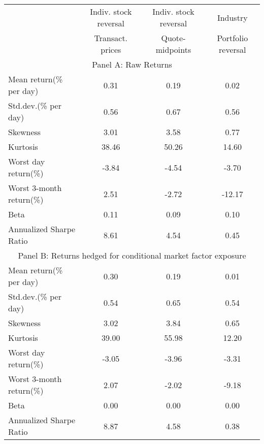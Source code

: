 \begin{tabular}{lccc}
\toprule
& Indiv. stock reversal & Indiv. stock reversal & Industry \\
& Transact. prices & Quote-midpoints & Portfolio reversal \\
\midrule
\multicolumn{4}{c}{Panel A: Raw Returns} \\
\midrule
Mean return(\% per day) & 0.31 & 0.19 & 0.02 \\
Std.dev.(\% per day) & 0.56 & 0.67 & 0.56 \\
Skewness & 3.01 & 3.58 & 0.77 \\
Kurtosis & 38.46 & 50.26 & 14.60 \\
Worst day return(\%) & -3.84 & -4.54 & -3.70 \\
Worst 3-month return(\%) & 2.51 & -2.72 & -12.17 \\
Beta & 0.11 & 0.09 & 0.10 \\
Annualized Sharpe Ratio & 8.61 & 4.54 & 0.45 \\
\midrule
\multicolumn{4}{c}{Panel B: Returns hedged for conditional market factor exposure} \\
\midrule
Mean return(\% per day) & 0.30 & 0.19 & 0.01 \\
Std.dev.(\% per day) & 0.54 & 0.65 & 0.54 \\
Skewness & 3.02 & 3.84 & 0.65 \\
Kurtosis & 39.00 & 55.98 & 12.20 \\
Worst day return(\%) & -3.05 & -3.96 & -3.31 \\
Worst 3-month return(\%) & 2.07 & -2.02 & -9.18 \\
Beta & 0.00 & 0.00 & 0.00 \\
Annualized Sharpe Ratio & 8.87 & 4.58 & 0.38 \\
\bottomrule
\end{tabular}